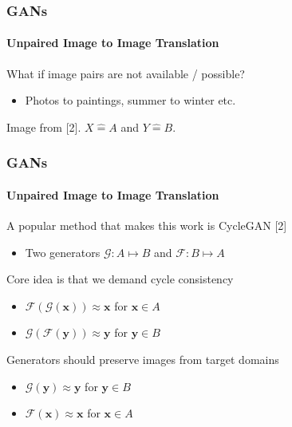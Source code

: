 \documentclass[xetex,professionalfont]{beamer}
\renewcommand\emph[1]{\textcolor{tuwcvl_cvl_blue}{#1}}
\renewcommand{\vec}[1]{\ensuremath{\mathbf{#1}}}
\newcommand{\vx}{\vec{x}}
\newcommand{\vy}{\vec{y}}
\newcommand{\cG}{\mathcal{G}}
\newcommand{\cF}{\mathcal{F}}
\begin{document}
\begin{frame}
	\frametitle{GANs}
	\framesubtitle{Unpaired Image to Image Translation}

	What if image pairs are not available / possible?
	\begin{itemize}
		\item Photos to paintings, summer to winter etc.
	\end{itemize}

	\medskip

	\begin{center}
		{\centering Image from [2]. $X\mathrel{\widehat{=}}A$ and $Y\mathrel{\widehat{=}}B$.}
	\end{center}

\end{frame}


\begin{frame}
	\frametitle{GANs}
	\framesubtitle{Unpaired Image to Image Translation}

	A popular method that makes this work is \emph{CycleGAN} [2]
	\begin{itemize}
		\item Two generators $\cG:A\mapsto B$ and $\cF:B\mapsto A$
	\end{itemize}

	\bigskip

	Core idea is that we demand \emph{cycle consistency} %
	\begin{itemize}
		\item $\cF(\cG(\vx))\approx\vx$ for $\vx\in A$
		\item $\cG(\cF(\vy))\approx\vy$ for $\vy\in B$
	\end{itemize}

	\bigskip

	Generators should preserve images from target domains
	\begin{itemize}
		\item $\cG(\vy)\approx\vy$ for $\vy\in B$
		\item $\cF(\vx)\approx\vx$ for $\vx\in A$
	\end{itemize}

\end{frame}
\end{document}
